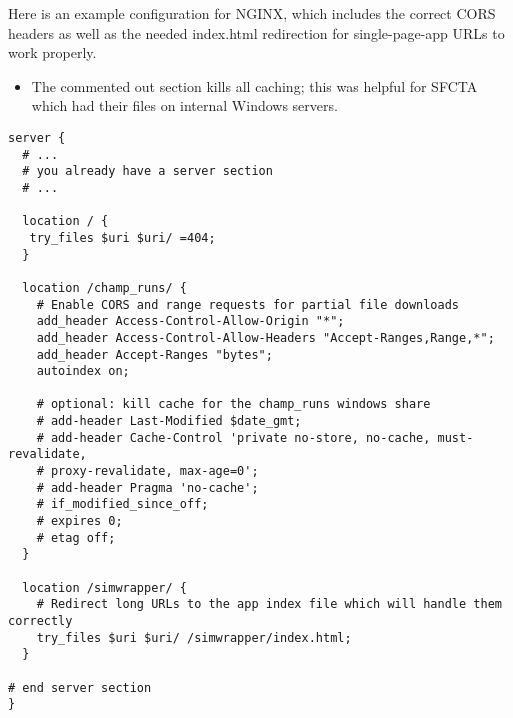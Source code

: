 Here is an example configuration for NGINX, which includes the correct
CORS headers as well as the needed index.html redirection for
single-page-app URLs to work properly.

\begin{itemize}
\tightlist
\item
  The commented out section kills all caching; this was helpful for
  SFCTA which had their files on internal Windows servers.
\end{itemize}

\begin{verbatim}
server {
  # ...
  # you already have a server section
  # ...

  location / {
   try_files $uri $uri/ =404;
  }

  location /champ_runs/ {
    # Enable CORS and range requests for partial file downloads
    add_header Access-Control-Allow-Origin "*";
    add_header Access-Control-Allow-Headers "Accept-Ranges,Range,*";
    add_header Accept-Ranges "bytes";
    autoindex on;

    # optional: kill cache for the champ_runs windows share
    # add-header Last-Modified $date_gmt;
    # add-header Cache-Control 'private no-store, no-cache, must-revalidate,
    # proxy-revalidate, max-age=0';
    # add-header Pragma 'no-cache';
    # if_modified_since_off;
    # expires 0;
    # etag off;
  }

  location /simwrapper/ {
    # Redirect long URLs to the app index file which will handle them correctly
    try_files $uri $uri/ /simwrapper/index.html;
  }

# end server section
}
\end{verbatim}
